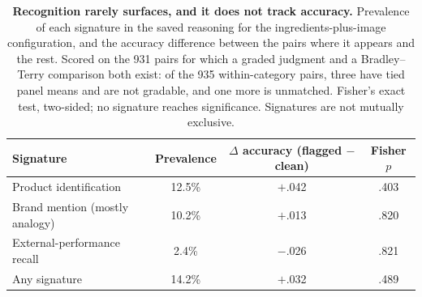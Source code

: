 \begin{table}[t]
\centering
\footnotesize
\setlength{\tabcolsep}{6pt}
\renewcommand{\arraystretch}{0.95}
\caption{\textbf{Recognition rarely surfaces, and it does not track accuracy.}
Prevalence of each signature in the saved reasoning for the ingredients-plus-image
configuration, and the accuracy difference between the pairs where it appears and the
rest. Scored on the 931 pairs for which a graded judgment and a Bradley--Terry
comparison both exist: of the 935 within-category pairs, three have tied panel means and
are not gradable, and one more is unmatched. Fisher's exact test, two-sided; no
signature reaches significance. Signatures are not mutually exclusive.}
\label{tab:recognition-signatures}
\begin{tabular}{@{}lccc@{}}
\toprule
Signature & Prevalence & $\Delta$ accuracy (flagged $-$ clean) & Fisher $p$ \\
\midrule
Product identification & 12.5\% & $+$.042 & .403 \\
Brand mention (mostly analogy) & 10.2\% & $+$.013 & .820 \\
External-performance recall & 2.4\% & $-$.026 & .821 \\
Any signature & 14.2\% & $+$.032 & .489 \\
\bottomrule
\end{tabular}
\end{table}
